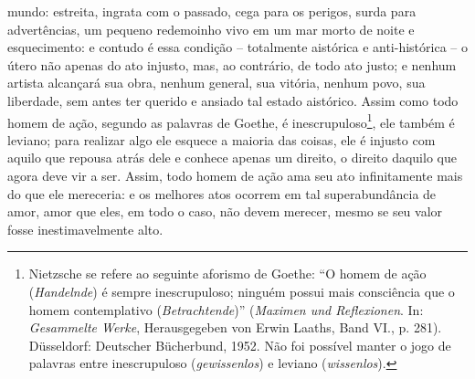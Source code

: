 mundo: estreita, ingrata com o passado, cega para os perigos, surda para
advertências, um pequeno redemoinho vivo em um mar morto de noite e
esquecimento: e contudo é essa condição -- totalmente aistórica e
anti-histórica -- o útero não apenas do ato injusto, mas, ao contrário,
de todo ato justo; e nenhum artista alcançará sua obra, nenhum general,
sua vitória, nenhum povo, sua liberdade, sem antes ter querido e ansiado
tal estado aistórico. Assim como todo homem de ação, segundo as palavras
de Goethe, é inescrupuloso\footnote{Nietzsche se refere ao seguinte
  aforismo de Goethe: ``O homem de ação (\emph{Handelnde}) é sempre
  inescrupuloso; ninguém possui mais consciência que o homem
  contemplativo (\emph{Betrachtende})'' (\emph{Maximen und Reflexionen}.
  In: \emph{Gesammelte Werke}, Herausgegeben von Erwin Laaths, Band VI.,
  p. 281). Düsseldorf: Deutscher Bücherbund, 1952. Não foi possível
  manter o jogo de palavras entre inescrupuloso (\emph{gewissenlos}) e
  leviano (\emph{wissenlos}).}, ele também é leviano; para realizar algo
ele esquece a maioria das coisas, ele é injusto com aquilo que repousa
atrás dele e conhece apenas um direito, o direito daquilo que agora deve
vir a ser. Assim, todo homem de ação ama seu ato infinitamente mais do
que ele mereceria: e os melhores atos ocorrem em tal superabundância de
amor, amor que eles, em todo o caso, não devem merecer, mesmo se seu
valor fosse inestimavelmente alto.

